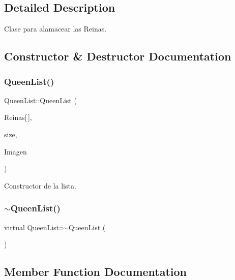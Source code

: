 \subsection{Detailed Description}
Clase para alamacear las Reinas. 

\subsection{Constructor \& Destructor Documentation}
\mbox{\label{class_queen_list_a8da503b129e3001f41b33aceac3aab0f}} 
\subsubsection{\texorpdfstring{Queen\+List()}{QueenList()}}
{\footnotesize\ttfamily Queen\+List\+::\+Queen\+List (\begin{DoxyParamCaption}\item[{\hyperlink{class_queen}{Queen}}]{Reinas\mbox{[}$\,$\mbox{]},  }\item[{int}]{size,  }\item[{A\+L\+L\+E\+G\+R\+O\+\_\+\+B\+I\+T\+M\+AP $\ast$}]{Imagen }\end{DoxyParamCaption})}



Constructor de la lista. 

\mbox{\label{class_queen_list_aa427af2634901d7de29e414d85d0921a}} 
\subsubsection{\texorpdfstring{$\sim$\+Queen\+List()}{~QueenList()}}
{\footnotesize\ttfamily virtual Queen\+List\+::$\sim$\+Queen\+List (\begin{DoxyParamCaption}{ }\end{DoxyParamCaption})\hspace{0.3cm}{\ttfamily [virtual]}}



\subsection{Member Function Documentation}
\mbox{\label{class_queen_list_a1afb3a3963b23ec1e959ac014986d697}} 
